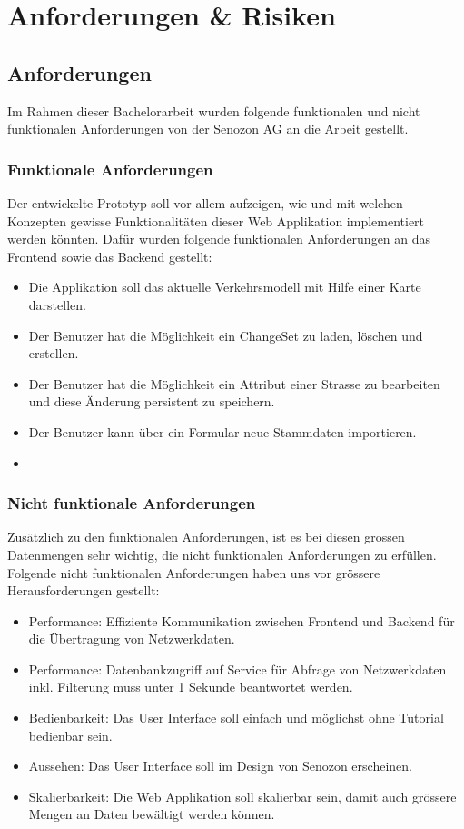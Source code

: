 
\chapter{Anforderungen \& Risiken} \label{ch:anforderungen_section}
\section{Anforderungen}
Im Rahmen dieser Bachelorarbeit wurden folgende funktionalen und nicht funktionalen Anforderungen von der Senozon AG an die Arbeit gestellt.
\subsection{Funktionale Anforderungen}
Der entwickelte Prototyp soll vor allem aufzeigen, wie und mit welchen Konzepten gewisse Funktionalitäten dieser Web Applikation implementiert werden könnten. Dafür wurden folgende funktionalen Anforderungen an das Frontend sowie das Backend gestellt:
\begin{itemize}
\item Die Applikation soll das aktuelle Verkehrsmodell mit Hilfe einer Karte darstellen.
\item Der Benutzer hat die Möglichkeit ein ChangeSet zu laden, löschen und erstellen.
\item Der Benutzer hat die Möglichkeit ein Attribut einer Strasse zu bearbeiten und diese Änderung persistent zu speichern.
\item Der Benutzer kann über ein Formular neue Stammdaten importieren.
\item 
\end{itemize}
\subsection{Nicht funktionale Anforderungen}
Zusätzlich zu den funktionalen Anforderungen, ist es bei diesen grossen Datenmengen sehr wichtig, die nicht funktionalen Anforderungen zu erfüllen. Folgende nicht funktionalen Anforderungen haben uns vor grössere Herausforderungen gestellt:
\begin{itemize}
\item Performance: Effiziente Kommunikation zwischen Frontend und Backend für die Übertragung von Netzwerkdaten.
\item Performance: Datenbankzugriff auf Service für Abfrage von Netzwerkdaten inkl. Filterung muss unter 1 Sekunde beantwortet werden.
\item Bedienbarkeit: Das User Interface soll einfach und möglichst ohne Tutorial bedienbar sein.
\item Aussehen: Das User Interface soll im Design von Senozon erscheinen.
\item Skalierbarkeit: Die Web Applikation soll skalierbar sein, damit auch grössere Mengen an Daten bewältigt werden können.
\end{itemize}
